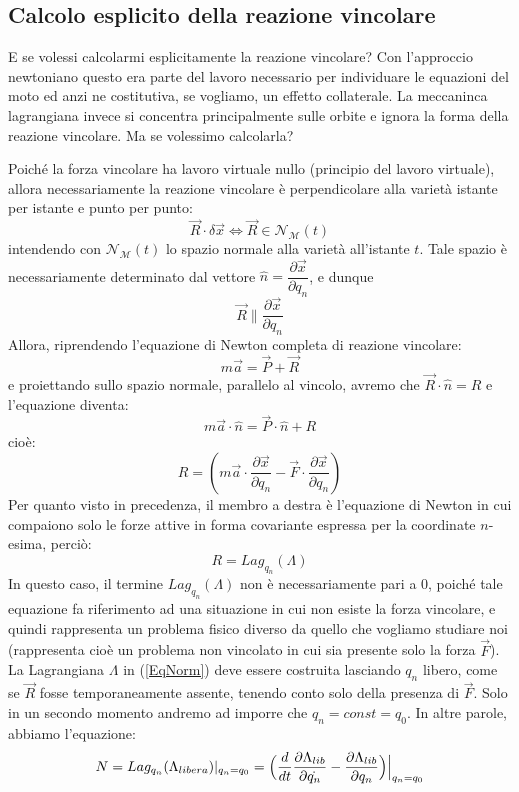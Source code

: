 \documentclass[a4paper,openany]{article}
\begin{document}
	\subsection{Calcolo esplicito della reazione vincolare}
	E se volessi calcolarmi esplicitamente la reazione vincolare? Con l'approccio newtoniano questo era parte del lavoro necessario per individuare le equazioni del moto ed anzi ne costitutiva, se vogliamo, un effetto collaterale. La meccaninca lagrangiana invece si concentra principalmente sulle orbite e ignora la forma della reazione vincolare. Ma se volessimo calcolarla? 
	
	Poiché la forza vincolare ha lavoro virtuale nullo (principio del lavoro virtuale), allora necessariamente la reazione vincolare è perpendicolare alla varietà istante per istante e punto per punto:
	$$
	\vec{R} \cdot \delta \vec{x} \iff \vec{R} \in \mathcal{N}_{\mathcal{M}}(t)
	$$
	intendendo con $\mathcal{N}_{\mathcal{M}}(t)$ lo spazio normale alla varietà all'istante $t$. Tale spazio è necessariamente determinato dal vettore $\hat{n} = \dfrac{\partial \vec{x}}{\partial q_n}$, e dunque
	$$
	\vec{R} \parallel \dfrac{\partial \vec{x}}{\partial q_n}
	$$
	Allora, riprendendo l'equazione di Newton completa di reazione vincolare:
	$$
	m\vec{a} = \vec{P} + \vec{R}
	$$
	e proiettando sullo spazio normale, parallelo al vincolo, avremo che $\vec{R}\cdot\hat{n} = R$ e l'equazione diventa:
	$$
	m\vec{a}\cdot\hat{n} = \vec{P}\cdot\hat{n} + R
	$$
	cioè:
	$$
	R = (m\vec{a}\cdot\dfrac{\partial \vec{x}}{\partial q_n} - \vec{F}\cdot \dfrac{\partial \vec{x}}{\partial q_n})
	$$
	Per quanto visto in precedenza, il membro a destra è l'equazione di Newton in cui compaiono solo le forze attive in forma covariante espressa per la coordinate $n$-esima, perciò:
	\begin{equation}
		R = Lag_{q_n}(\Lambda)
		\label{EqNorm}
	\end{equation}
	In questo caso, il termine $Lag_{q_n}(\Lambda)$ non è necessariamente pari a 0, poiché tale equazione fa riferimento ad una situazione in cui non esiste la forza vincolare, e quindi rappresenta un problema fisico diverso da quello che vogliamo studiare noi (rappresenta cioè un problema non vincolato in cui sia presente solo la forza $\vec{F}$). La Lagrangiana $\Lambda$ in (\ref{EqNorm}) deve essere costruita lasciando $q_n$ libero, come se $\vec{R}$ fosse temporaneamente assente, tenendo conto solo della presenza di $\vec{F}$. Solo in un secondo momento andremo ad imporre che $q_n = const = q_0$. In altre parole, abbiamo l'equazione:
	\begin{equation}
		N = Lag_{q_n}(\Lambda_{libera})|_{q_n=q_0} = \Bigl(\dfrac{d}{dt}\dfrac{\partial \Lambda_{lib}}{\partial \dot{q_n}} - \dfrac{\partial \Lambda_{lib}}{\partial q_n}\Bigl)\Bigl|_{q_n = q_0}
		\label{ReazioneVincolare}
	\end{equation}
	
\end{document}
